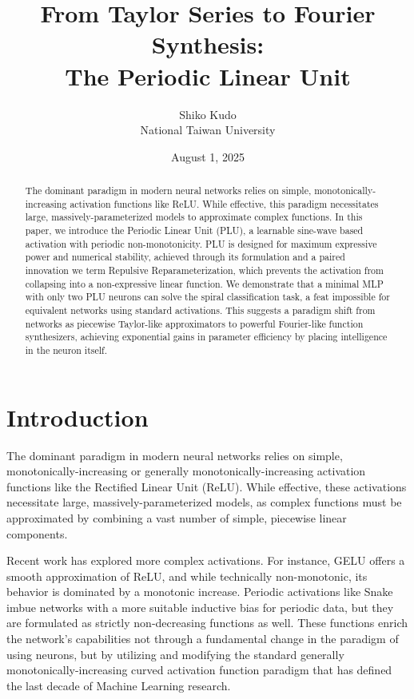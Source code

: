\documentclass[11pt, letterpaper]{article}
\title{From Taylor Series to Fourier Synthesis: \\ The Periodic Linear Unit}
\author{Shiko Kudo \\ National Taiwan University}
\date{August 1, 2025}
\begin{document}
\maketitle

\begin{abstract}
The dominant paradigm in modern neural networks relies on simple, monotonically-increasing activation functions like ReLU. While effective, this paradigm necessitates large, massively-parameterized models to approximate complex functions. In this paper, we introduce the Periodic Linear Unit (PLU), a learnable sine-wave based activation with periodic non-monotonicity. PLU is designed for maximum expressive power and numerical stability, achieved through its formulation and a paired innovation we term Repulsive Reparameterization, which prevents the activation from collapsing into a non-expressive linear function. We demonstrate that a minimal MLP with only two PLU neurons can solve the spiral classification task, a feat impossible for equivalent networks using standard activations. This suggests a paradigm shift from networks as piecewise Taylor-like approximators to powerful Fourier-like function synthesizers, achieving exponential gains in parameter efficiency by placing intelligence in the neuron itself.
\end{abstract}

\section{Introduction}

The dominant paradigm in modern neural networks relies on simple, monotonically-increasing or generally monotonically-increasing activation functions like the Rectified Linear Unit (ReLU). While effective, these activations necessitate large, massively-parameterized models, as complex functions must be approximated by combining a vast number of simple, piecewise linear components.

Recent work has explored more complex activations. For instance, GELU \cite{hendrycks2016gaussianerrorlinearunits} offers a smooth approximation of ReLU, and while technically non-monotonic, its behavior is dominated by a monotonic increase. Periodic activations like Snake \cite{ziyin2020neuralnetworksfaillearn} imbue networks with a more suitable inductive bias for periodic data, but they are formulated as strictly non-decreasing functions as well. These functions enrich the network's capabilities not through a fundamental change in the paradigm of using neurons, but by utilizing and modifying the standard generally monotonically-increasing curved activation function paradigm that has defined the last decade of Machine Learning research.
\end{document}
